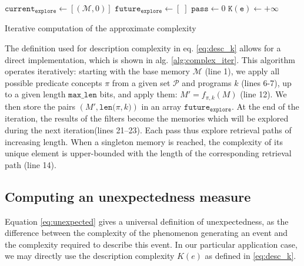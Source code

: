 \documentclass[conference]{IEEEtran}
\begin{document}
\begin{algorithm}
  $\mathtt{current_{explore}} \leftarrow [(\mathcal{M}, 0)]$ \;
  $\mathtt{future_{explore} \leftarrow} [\;]$ \;
  $\mathtt{pass} \leftarrow 0$ \;
  $\mathtt{K(e)} \leftarrow +\infty$ \;
  \caption{Iterative computation of the approximate complexity}
  \label{alg:complex_iter}
\end{algorithm}

The definition used for description complexity in eq. \ref{eq:desc_k} allows for
a direct implementation, which is shown in alg. \ref{alg:complex_iter}. This
algorithm operates iteratively: starting with the base memory $\mathcal{M}$
(line 1), we apply all possible predicate concepts $\pi$ from a given set
$\mathcal{P}$ and programs $k$ (lines 6-7), up to a given length $\mathtt
{max\_len}$ bits, and apply them: $M' = f_{\pi, k}(M)$ (line 12). We then store
the pairs $(M', \mathtt{len(}\pi, k\mathtt{)})$ in an array $\mathtt{future_
{explore}}$. At the end of the iteration, the results of the filters become the
memories which will be explored during the next iteration(lines 21--23). Each
pass thus explore retrieval paths of increasing length. When a singleton memory
is reached, the complexity of its unique element is upper-bounded with the
length of the corresponding retrieval path (line 14).

\subsection{Computing an unexpectedness measure}
Equation \ref{eq:unexpected} gives a universal definition of unexpectedness, as
the difference between the complexity of the phenomenon generating an event and
the complexity required to describe this event. In our particular application
case, we may directly use the description complexity $K(e)$ as defined in
\ref{eq:desc_k}.
\end{document}
